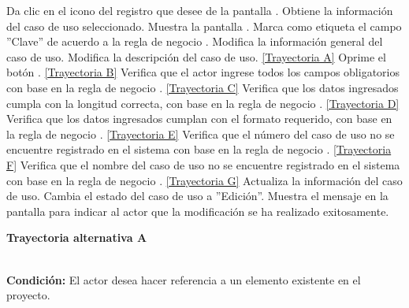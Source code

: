	\begin{UCtrayectoria}
		\UCpaso[\UCactor] Da clic en el icono \editar del registro que desee de la pantalla .
		\UCpaso[\UCsist] Obtiene la información del caso de uso seleccionado.
		\UCpaso[\UCsist] Muestra la pantalla .\label{CU12.2-P4}
		\UCpaso[\UCsist] Marca como etiqueta el campo ''Clave'' de acuerdo a la regla de negocio .
		\UCpaso[\UCactor] Modifica la información general del caso de uso. \label{CU12.2-P5}
		\UCpaso[\UCactor] Modifica la descripción del caso de uso. \label{CU12.2-P6} \hyperlink{CU12-2:TAA}{[Trayectoria A]}
		\UCpaso[\UCactor] Oprime el botón . \label{CU12.2-P9} \hyperlink{CU12-2:TAB}{[Trayectoria B]}
		\UCpaso[\UCsist] Verifica que el actor ingrese todos los campos obligatorios con base en la regla de negocio . \hyperlink{CU12-2:TAC}{[Trayectoria C]}
		\UCpaso[\UCsist] Verifica que los datos ingresados cumpla con la longitud correcta, con base en la regla de negocio . \hyperlink{CU12-2:TAD}{[Trayectoria D]}
		\UCpaso[\UCsist] Verifica que los datos ingresados cumplan con el formato requerido, con base en la regla de negocio . \hyperlink{CU12-2:TAE}{[Trayectoria E]}
		\UCpaso[\UCsist] Verifica que el número del caso de uso no se encuentre registrado en el sistema con base en la regla de negocio . \hyperlink{CU12-2:TAF}{[Trayectoria F]}
		\UCpaso[\UCsist] Verifica que el nombre del caso de uso no se encuentre registrado en el sistema con base en la regla de negocio . \hyperlink{CU12-2:TAG}{[Trayectoria G]}
		\UCpaso[\UCsist] Actualiza la información del caso de uso.
		\UCpaso[\UCsist] Cambia el estado del caso de uso a ''Edición''.
		\UCpaso[\UCsist] Muestra el mensaje  en la pantalla  para indicar al actor que la modificación se ha realizado exitosamente.
	\end{UCtrayectoria}		
\hypertarget{CU12-2:TAA}{\textbf{Trayectoria alternativa A}}\\
\noindent \textbf{Condición:} El actor desea hacer referencia a un elemento existente en el proyecto.

